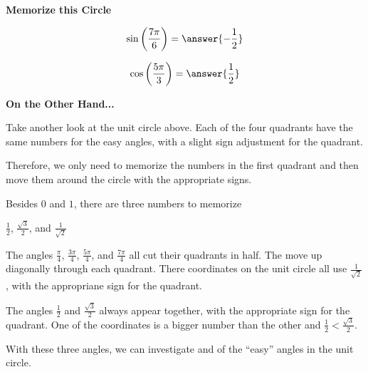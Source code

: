 \documentclass{ximera}
\begin{document}
\begin{center}
\textbf{\textcolor{red!70!black}{Memorize this Circle}}
\end{center}





\begin{question} 


\[
\sin\left( \frac{7\pi}{6} \right) = \answer{-\frac{1}{2}}
\]


\end{question}









\begin{question} 


\[
\cos\left( \frac{5\pi}{3} \right) = \answer{\frac{1}{2}}
\]


\end{question}






\textbf{\textcolor{blue!55!black}{On the Other Hand...}}


Take another look at the unit circle above. Each of the four quadrants have the same numbers for the easy angles, with a slight sign adjustment for the quadrant.

Therefore, we only need to memorize the numbers in the first quadrant and then move them around the circle with the appropriate signs.

Besides $0$ and $1$, there are three numbers to memorize


\begin{center}
$\frac{1}{2}$, $\frac{\sqrt{3}}{2}$, and $\frac{1}{\sqrt{2}}$
\end{center}


The angles $\frac{\pi}{4}$, $\frac{3\pi}{4}$, $\frac{5\pi}{4}$, and $\frac{7\pi}{4}$ all cut their quadrants in half.  The move up diagonally through each quadrant.  There coordinates on the unit circle all use $\frac{1}{\sqrt{2}}$, with the appropriane sign for the quadrant.

The angles $\frac{1}{2}$ and $\frac{\sqrt{3}}{2}$ always appear together, with the appropriate sign for the quadrant. One of the coordinates is a bigger number than the other and $\frac{1}{2} < \frac{\sqrt{3}}{2}$.  

With these three angles, we can investigate and of the ``easy'' angles in the unit circle.
\end{document}
